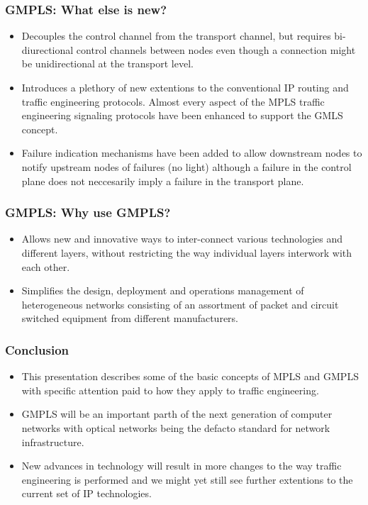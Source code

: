 \documentclass[12pt]{beamer}
\begin{document}
\begin{frame}
  \frametitle{GMPLS: What else is new?}
  \begin{itemize}
    \item Decouples the control channel from the transport channel, but requires bi-diurectional control channels between nodes even though a connection might be unidirectional at the transport level.
    \item Introduces a plethory of new extentions to the conventional IP routing and traffic engineering protocols. Almost every aspect of the MPLS traffic engineering signaling protocols have been enhanced to support the GMLS concept.
    \item Failure indication mechanisms have been added to allow downstream nodes to notify upstream nodes of failures (no light) although a failure in the control plane does not neccesarily imply a failure in the transport plane.
  \end{itemize}
\end{frame}

\begin{frame}
  \frametitle{GMPLS: Why use GMPLS?}
  \begin{itemize}                             
    \item Allows new and innovative ways to inter-connect various technologies and different layers, without restricting the way individual layers interwork with each other. 
    \item Simplifies the design, deployment and operations management of heterogeneous networks consisting of an assortment of packet and circuit switched equipment from different manufacturers.
  \end{itemize}
\end{frame}

\begin{frame}
  \frametitle{Conclusion}
  \begin{itemize}                             
    \item This presentation describes some of the basic concepts of MPLS and GMPLS with specific attention paid to how they apply to traffic engineering.
    \item GMPLS will be an important parth of the next generation of computer networks with optical networks being the defacto standard for network infrastructure.
    \item New advances in technology will result in more changes to the way traffic engineering is performed and we might yet still see further extentions to the current set of IP technologies.  
  \end{itemize}
\end{frame}
\end{document}
